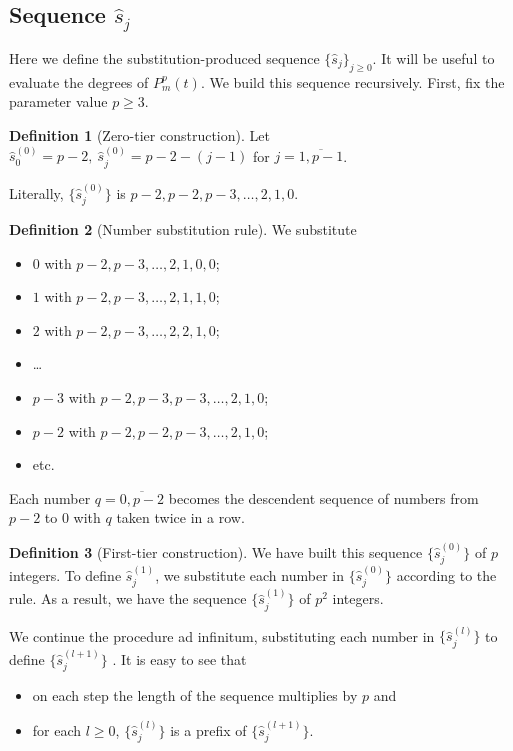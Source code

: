 \documentclass[a4paper]{article}
\theoremstyle{plain}
\theoremstyle{definition}
\newtheorem{definition}{Definition}
\begin{document}
\subsection{Sequence $\hat{s}_j$}
Here we define the substitution-produced sequence $\{\hat{s}_j\}_{j \ge 0}$. It will be useful to evaluate the degrees of $P_m^p(t)$. We build this sequence recursively. First, fix the parameter value $p \ge 3$.
\begin{definition}[Zero-tier construction]
Let $\hat{s}_0^{(0)} = p-2,\ \hat{s}_j^{(0)} = p-2-(j-1)$ for $j = \overline{1, p-1}$.
\end{definition}
Literally, $\{ \hat{s}_j^{(0)}\}$ is $p-2, p-2, p-3, \ldots, 2, 1, 0$.
\begin{definition} [Number substitution rule]
We substitute
\begin{itemize}
 \item $0$ with $p-2, p-3, \ldots, 2, 1, 0, 0$;
 \item $1$ with $p-2, p-3, \ldots, 2, 1, 1, 0$;
 \item $2$ with $p-2, p-3, \ldots, 2, 2, 1, 0$;
 \item \ldots
 \item $p-3$ with $p-2, p-3, p-3, \ldots, 2, 1, 0$;
 \item $p-2$ with $p-2, p-2, p-3, \ldots, 2, 1, 0$;

 \item etc.
 \end{itemize}
 Each number $q = \overline{0, p-2}$ becomes the descendent sequence of numbers from $p-2$ to $0$ with $q$ taken twice in a row.
\end{definition}
\begin{definition}[First-tier construction]\label{tier1}
 We have built this sequence $\{ \hat{s}_j^{(0)}\}$  of $p$ integers. To define 
$\hat{s}_j^{(1)}$, we substitute each number in $\{ \hat{s}_j^{(0)}\}$ according to the rule. As a result, we have the sequence $\{\hat{s}_j^{(1)}\}$ of $p^2$ integers.
\end{definition}
We continue the procedure ad infinitum, substituting each number in $\{ \hat{s}_j^{(l)}\}$  to define $\{ \hat{s}_j^{(l+1)}\}$ . It is easy to see that
\begin{itemize}
\item on each step the length of the sequence multiplies by $p$ and
\item for each $l \ge 0$,  $\{ \hat{s}_j^{(l)}\}$ is a prefix of $\{ \hat{s}_j^{(l+1)}\}$.
\end{itemize}
\end{document}
